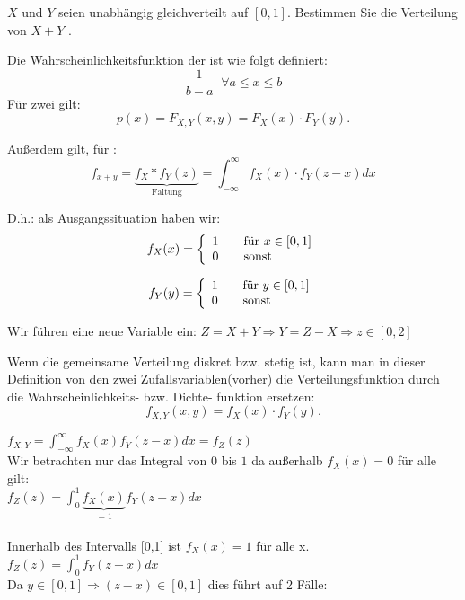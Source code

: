 \begin{uebsp}
\begin{Exercise}[label=ex:2.4]
$X$ und $Y$ seien unabhängig gleichverteilt auf $[0, 1]$. Bestimmen Sie die Verteilung von $X + Y$ .
\end{Exercise}
\begin{Answer}

\begin{uebsp_theory}
    Die Wahrscheinlichkeitsfunktion der  ist wie folgt definiert:
    \[\frac{1}{b-a}\;\;\forall a\leq x\leq b\]
    Für zwei  gilt: 
    \[p(x)=F_{X,Y}(x,y)=F_{X}(x)\cdot F_Y(y).\]

    Außerdem gilt, für : 
    \[f_{x+y}=\underbrace{f_X*f_Y(z)}_{\text{Faltung}}=\int_{-\infty}^{\infty}f_X(x)\cdot f_Y(z-x)dx\]
\end{uebsp_theory}

D.h.: als Ausgangssituation haben wir:
\[ f_X(x) = \left\{
  \begin{array}{l l}
    1 & \quad \text{für $x \in [0,1]$}\\
    0 & \quad \text{sonst}
  \end{array} \right.\]
  
\[ f_Y(y) = \left\{
    \begin{array}{l l}
      1 & \quad \text{für $y \in [0,1]$}\\
      0 & \quad \text{sonst}
    \end{array} \right.\]

Wir führen eine neue Variable ein: $Z=X+Y \Rightarrow Y=Z-X \Rightarrow z \in [0,2]$

\begin{uebsp_theory}
    Wenn die gemeinsame Verteilung diskret bzw. stetig ist, kann man in dieser
    Definition von den zwei Zufallsvariablen(vorher) die Verteilungsfunktion durch die Wahrscheinlichkeits- bzw. Dichte-
    funktion ersetzen:
    \[f_{X,Y}(x,y)=f_{X}(x)\cdot f_Y(y).\]
\end{uebsp_theory}

$f_{X,Y}=\int_{-\infty}^{\infty}f_X(x)f_Y(z-x)dx = f_Z(z)$ \\
Wir betrachten nur das Integral von $0$ bis $1$ da außerhalb $f_X(x)=0$ für alle gilt:\\
$f_Z(z) = \int_{0}^{1} \underbrace{f_X(x)}_{=1}f_Y(z-x)dx  $\\ \\
Innerhalb des Intervalls [0,1] ist $f_X(x)=1$ für alle x. \\
$f_Z(z)=\int_{0}^{1}f_Y(z-x)dx$ \\
Da $y \in [0,1] \Rightarrow (z-x) \in [0,1] $ dies führt auf 2 Fälle:


\end{Answer}
\end{uebsp}
